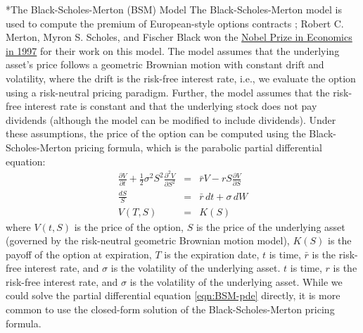 \documentclass[11pt]{article}
\makeatletter
\theoremstyle{definition}
\renewcommand\subsubsection{\@startsection
	{subsubsection}{2}{0mm}
	{-0.05in}
	{-0.5\baselineskip}
	{\normalfont\normalsize\itshape\bfseries}}
\makeatother
\begin{document}
\subsubsection*{The Black-Scholes-Merton (BSM) Model}
The Black-Scholes-Merton model is used to compute the premium of European-style options contracts \cite{BlackScholes1973};
Robert C. Merton, Myron S. Scholes, and Fischer Black won the \href{https://www.nobelprize.org/prizes/economic-sciences/1997/press-release/}{Nobel Prize in Economics in 1997} for their work on this model.
The model assumes that the underlying asset's price follows a geometric Brownian motion with constant drift and volatility, where the drift is the risk-free interest rate, i.e., we evaluate the option using a risk-neutral pricing paradigm.
Further, the model assumes that the risk-free interest rate is constant and that the underlying stock does not pay dividends (although the model can be modified to include dividends).
Under these assumptions, the price of the option can be computed using the Black-Scholes-Merton pricing formula, which is the parabolic partial differential equation:
\begin{eqnarray}\label{eqn:BSM-pde}
	\frac{\partial{V}}{\partial{t}} + \frac{1}{2}\sigma^{2}S^{2}\frac{\partial^{2}V}{\partial{S}^{2}} & = & \bar{r}V - rS\frac{\partial{V}}{\partial{S}}  \\
	\frac{dS}{S} & = & \bar{r}\,dt + \sigma\,{dW}\\
	V(T,S) & = & K(S)
\end{eqnarray}
where $V(t, S)$ is the price of the option, $S$ is the price of the underlying asset (governed by the risk-neutral geometric Brownian motion model), 
$K(S)$ is the payoff of the option at expiration, $T$ is the expiration date, $t$ is time, 
$\bar{r}$ is the risk-free interest rate, and $\sigma$ is the volatility of the underlying asset.
$t$ is time, $r$ is the risk-free interest rate, and $\sigma$ is the volatility of the underlying asset.
While we could solve the partial differential equation \ref{eqn:BSM-pde} directly, it is more common to use the closed-form solution of the Black-Scholes-Merton pricing formula.
\end{document}
